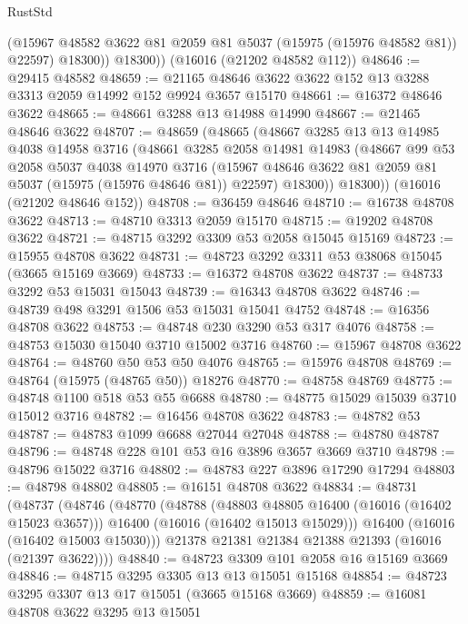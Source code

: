 \begin{lexlean}{RustStd}
\begin{coremodule}
            (@15967 @48582 @3622 @81 @2059 @81 @5037 (@15975 (@15976 @48582 @81)) @22597)
            @18300))
        @18300))
    (@16016 (@21202 @48582 @112))
@48646 := @29415 @48582
@48659 := @21165 @48646 @3622 @3622 @152 @13 @3288 @3313 @2059 @14992 @152 @9924 @3657 @15170
@48661 := @16372 @48646 @3622
@48665 := @48661 @3288 @13 @14988 @14990
@48667 := @21465 @48646 @3622
@48707 := @48659
    (@48665
      (@48667
        @3285
        @13
        @13
        @14985
        @4038
        @14958
        @3716
        (@48661
          @3285
          @2058
          @14981
          @14983
          (@48667
            @99
            @53
            @2058
            @5037
            @4038
            @14970
            @3716
            (@15967 @48646 @3622 @81 @2059 @81 @5037 (@15975 (@15976 @48646 @81)) @22597)
            @18300))
        @18300))
    (@16016 (@21202 @48646 @152))
@48708 := @36459 @48646
@48710 := @16738 @48708 @3622
@48713 := @48710 @3313 @2059 @15170
@48715 := @19202 @48708 @3622
@48721 := @48715 @3292 @3309 @53 @2058 @15045 @15169
@48723 := @15955 @48708 @3622
@48731 := @48723 @3292 @3311 @53 @38068 @15045 (@3665 @15169 @3669)
@48733 := @16372 @48708 @3622
@48737 := @48733 @3292 @53 @15031 @15043
@48739 := @16343 @48708 @3622
@48746 := @48739 @498 @3291 @1506 @53 @15031 @15041 @4752
@48748 := @16356 @48708 @3622
@48753 := @48748 @230 @3290 @53 @317 @4076
@48758 := @48753 @15030 @15040 @3710 @15002 @3716
@48760 := @15967 @48708 @3622
@48764 := @48760 @50 @53 @50 @4076
@48765 := @15976 @48708
@48769 := @48764 (@15975 (@48765 @50)) @18276
@48770 := @48758 @48769
@48775 := @48748 @1100 @518 @53 @55 @6688
@48780 := @48775 @15029 @15039 @3710 @15012 @3716
@48782 := @16456 @48708 @3622
@48783 := @48782 @53
@48787 := @48783 @1099 @6688 @27044 @27048
@48788 := @48780 @48787
@48796 := @48748 @228 @101 @53 @16 @3896 @3657 @3669 @3710
@48798 := @48796 @15022 @3716
@48802 := @48783 @227 @3896 @17290 @17294
@48803 := @48798 @48802
@48805 := @16151 @48708 @3622
@48834 := @48731
    (@48737
      (@48746
        (@48770
          (@48788
            (@48803 @48805 @16400 (@16016 (@16402 @15023 @3657)))
            @16400
            (@16016 (@16402 @15013 @15029)))
          @16400
          (@16016 (@16402 @15003 @15030)))
        @21378
        @21381
        @21384
        @21388
        @21393
        (@16016 (@21397 @3622))))
@48840 := @48723 @3309 @101 @2058 @16 @15169 @3669
@48846 := @48715 @3295 @3305 @13 @13 @15051 @15168
@48854 := @48723 @3295 @3307 @13 @17 @15051 (@3665 @15168 @3669)
@48859 := @16081 @48708 @3622 @3295 @13 @15051

\end{coremodule}
\end{lexlean}
